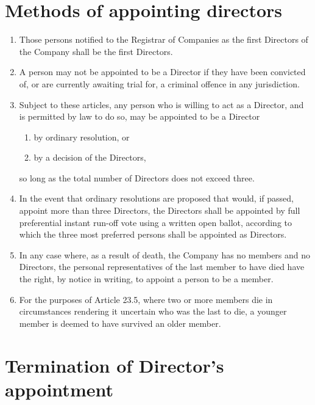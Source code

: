 \documentclass[a4paper,12pt]{article}
\renewcommand{\labelenumii}{\thesection.\arabic{enumi}.\arabic{enumii}}
\begin{document}
\section{Methods of appointing directors}

\begin{enumerate}
  \item Those persons notified to the Registrar of Companies as the first Directors of the Company shall be the first Directors.
  \item A person may not be appointed to be a Director if they have been convicted of, or are currently awaiting trial for, a criminal offence in any jurisdiction. %
  \item Subject to these articles, any person who is willing to act as a Director, and is permitted by law to do so, may be appointed to be a Director
  \begin{enumerate}
    \renewcommand{\labelenumii}{(\alph{enumii})}
    \item by ordinary resolution, or
    \item	by a decision of the Directors,
  \end{enumerate}
  so long as the total number of Directors does not exceed three. %
  \item In the event that ordinary resolutions are proposed that would, if passed, appoint more than three Directors, the Directors shall be appointed by full preferential instant run-off vote using a written open ballot, according to which the three most preferred persons shall be appointed as Directors. %
  \item In any case where, as a result of death, the Company has no members and no Directors, the personal representatives of the last member to have died have the right, by notice in writing, to appoint a person to be a member.
  \item For the purposes of Article 23.5, where two or more members die in circumstances rendering it uncertain who was the last to die, a younger member is deemed to have survived an older member.
\end{enumerate}

\section{Termination of Director’s appointment}
\end{document}
